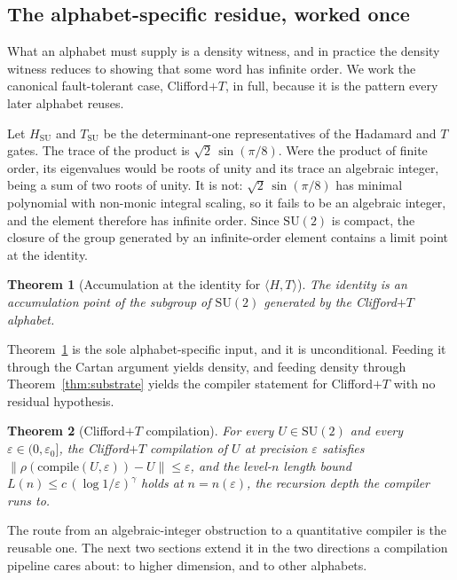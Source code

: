 \documentclass[aps,pra,reprint,nofootinbib,superscriptaddress]{revtex4-2}
\newcommand{\su}[1]{\mathrm{SU}(#1)}
\newcommand{\opn}[1]{\lVert #1 \rVert}
\theoremstyle{plain}
\newtheorem{theorem}{Theorem}
\theoremstyle{definition}
\begin{document}
\subsection{The alphabet-specific residue, worked once}
\label{sec:substrate-cliffordt}

What an alphabet must supply is a density witness, and in practice the density
witness reduces to showing that some word has infinite order. We work the
canonical fault-tolerant case, Clifford$+T$, in full, because it is the pattern
every later alphabet reuses.

Let $H_{\mathrm{SU}}$ and $T_{\mathrm{SU}}$ be the determinant-one
representatives of the Hadamard and $T$ gates. The trace of the product is
$\sqrt 2\,\sin(\pi/8)$. Were the product of finite order, its eigenvalues would
be roots of unity and its trace an algebraic integer, being a sum of two roots
of unity. It is not: $\sqrt 2\,\sin(\pi/8)$ has minimal polynomial with
non-monic integral scaling, so it fails to be an algebraic integer, and the
element therefore has infinite order. Since $\su 2$ is compact, the closure of
the group generated by an infinite-order element contains a limit point at the
identity.

\begin{theorem}[Accumulation at the identity for $\langle H, T\rangle$]
\label{thm:accpt}
The identity is an accumulation point of the subgroup of $\su 2$ generated by
the Clifford$+T$ alphabet.
\end{theorem}

Theorem~\ref{thm:accpt} is the sole alphabet-specific input, and it is
unconditional. Feeding it through the Cartan argument yields density, and
feeding density through Theorem~\ref{thm:substrate} yields the compiler
statement for Clifford$+T$ with no residual hypothesis.

\begin{theorem}[Clifford$+T$ compilation]
\label{thm:cliffordt}
For every $U \in \su 2$ and every $\varepsilon \in (0,\varepsilon_0]$, the
Clifford$+T$ compilation of $U$ at precision $\varepsilon$ satisfies
$\opn{\rho(\mathrm{compile}(U,\varepsilon)) - U} \le \varepsilon$, and the
level-$n$ length bound $L(n) \le c\,(\log 1/\varepsilon)^{\gamma}$ holds at
$n = n(\varepsilon)$, the recursion depth the compiler runs to.
\end{theorem}

The route from an algebraic-integer obstruction to a quantitative compiler is
the reusable one. The next two sections extend it in the two directions a
compilation pipeline cares about: to higher dimension, and to other alphabets.
\end{document}
